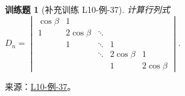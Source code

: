 \documentclass[UTF8,12pt,a4paper,fontset=fandol]{ctexart}
\newtheorem{exercise}{训练题}[section]
\begin{document}
\begin{exercise}[补充训练 L10-例-37]\label{prob:L10-例-37}
计算行列式$D_n=\begin{vmatrix}
            \cos \beta & 1            &        &              &              \\
            1          & 2 \cos \beta & \ddots &              &              \\
                       & 1            & \ddots & 1            &              \\
                       &              & \ddots & 2 \cos \beta & 1            \\
                       &              &        & 1            & 2 \cos \beta
        \end{vmatrix}$.
\end{exercise}
\noindent 来源：\href{https://github.com/yhwu-is/Linear-Algebra-Left-Undone/blob/new/%E8%AE%B2%E4%B9%89/%E4%B8%93%E9%A2%98/10%20%E8%A1%8C%E5%88%97%E5%BC%8F.tex}{L10-例-37}。
\end{document}
